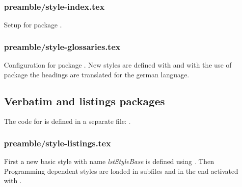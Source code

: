 
\subsubsection{preamble/style-index.tex}

Setup for package .


\subsubsection{preamble/style-glossaries.tex}

Configuration for package . New styles are defined with  and with the use of package  the headings are translated for the german language.


\subsection{Verbatim and listings packages}

The code for  is defined in a separate file: .


\subsubsection{preamble/style-listings.tex}

First a new basic style with name \emph{lstStyleBase} is defined using . Then Programming dependent styles are loaded in subfiles and in the end activated with .


